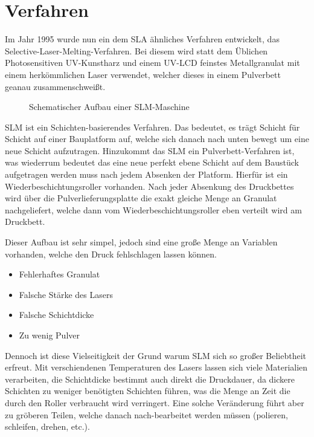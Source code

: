 \documentclass[main.tex]{subfiles}
\begin{document}
\section{Verfahren}
Im Jahr 1995 wurde nun ein dem SLA ähnliches Verfahren entwickelt, das Selective-Laser-Melting-Verfahren. Bei diesem wird statt dem Üblichen Photosensitiven UV-Kunstharz und einem UV-LCD feinstes Metallgranulat mit einem herkömmlichen Laser verwendet, welcher dieses in einem Pulverbett geanau zusammenschweißt. \parencite{3FAKTUR_1}
\begin{figure}[H]
\begin{center}
	\caption{Schematischer Aufbau einer SLM-Maschine}
	\label{img:slm_diagram}
\end{center}
\end{figure}	
SLM ist ein Schichten-basierendes Verfahren. Das bedeutet, es trägt Schicht für Schicht auf
einer Bauplatform auf, welche sich danach nach unten bewegt um eine neue Schicht aufzutragen. 
Hinzukommt das SLM ein Pulverbett-Verfahren ist, was wiederrum bedeutet das eine neue perfekt ebene Schicht auf dem Baustück aufgetragen werden muss nach jedem Absenken der Platform.
Hierfür ist ein Wiederbeschichtungsroller vorhanden. Nach jeder Absenkung des Druckbettes wird über die Pulverlieferungsplatte die exakt gleiche Menge an Granulat nachgeliefert, welche dann vom Wiederbeschichtungsroller eben verteilt wird am Druckbett. 

Dieser Aufbau ist sehr simpel, jedoch sind eine große Menge an Variablen vorhanden, welche den Druck fehlschlagen lassen können.
\begin{itemize}
\item Fehlerhaftes Granulat
\item Falsche Stärke des Lasers
\item Falsche Schichtdicke
\item Zu wenig Pulver
	
\end{itemize}
Dennoch ist diese Vielseitigkeit der Grund warum SLM sich so großer Beliebtheit erfreut. Mit verschiendenen Temperaturen des Lasers lassen sich viele Materialien verarbeiten, die Schichtdicke bestimmt auch direkt die Druckdauer, da dickere Schichten zu weniger benötigten Schichten führen, was die Menge an Zeit die durch den Roller verbraucht wird verringert.
Eine solche Veränderung führt aber zu gröberen Teilen, welche danach nach-bearbeitet werden müssen (polieren, schleifen, drehen, etc.). 
\end{document}

